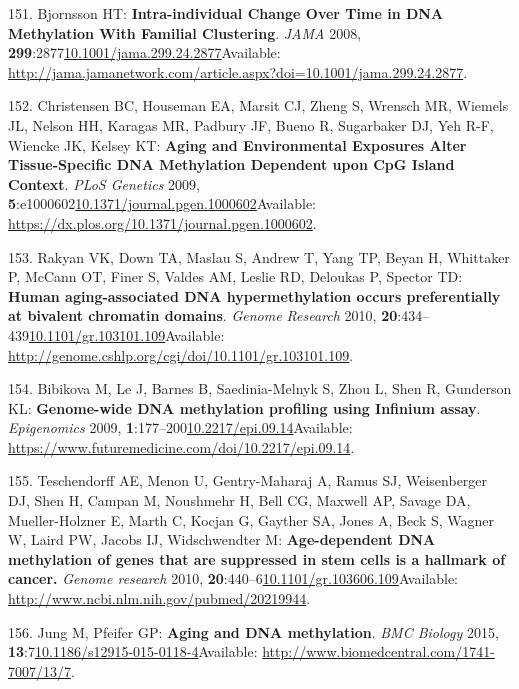 \documentclass[
]{book}
\begin{document}
\leavevmode\hypertarget{ref-Bjornsson2008}{}%
151. Bjornsson HT: \textbf{Intra-individual Change Over Time in DNA Methylation With Familial Clustering}. \emph{JAMA} 2008, \textbf{299}:2877\href{https://doi.org/10.1001/jama.299.24.2877}{10.1001/jama.299.24.2877}Available: \url{http://jama.jamanetwork.com/article.aspx?doi=10.1001/jama.299.24.2877}.

\leavevmode\hypertarget{ref-Christensen2009}{}%
152. Christensen BC, Houseman EA, Marsit CJ, Zheng S, Wrensch MR, Wiemels JL, Nelson HH, Karagas MR, Padbury JF, Bueno R, Sugarbaker DJ, Yeh R-F, Wiencke JK, Kelsey KT: \textbf{Aging and Environmental Exposures Alter Tissue-Specific DNA Methylation Dependent upon CpG Island Context}. \emph{PLoS Genetics} 2009, \textbf{5}:e1000602\href{https://doi.org/10.1371/journal.pgen.1000602}{10.1371/journal.pgen.1000602}Available: \url{https://dx.plos.org/10.1371/journal.pgen.1000602}.

\leavevmode\hypertarget{ref-Rakyan2010}{}%
153. Rakyan VK, Down TA, Maslau S, Andrew T, Yang TP, Beyan H, Whittaker P, McCann OT, Finer S, Valdes AM, Leslie RD, Deloukas P, Spector TD: \textbf{Human aging-associated DNA hypermethylation occurs preferentially at bivalent chromatin domains}. \emph{Genome Research} 2010, \textbf{20}:434--439\href{https://doi.org/10.1101/gr.103101.109}{10.1101/gr.103101.109}Available: \url{http://genome.cshlp.org/cgi/doi/10.1101/gr.103101.109}.

\leavevmode\hypertarget{ref-Bibikova2009}{}%
154. Bibikova M, Le J, Barnes B, Saedinia-Melnyk S, Zhou L, Shen R, Gunderson KL: \textbf{Genome-wide DNA methylation profiling using Infinium assay}. \emph{Epigenomics} 2009, \textbf{1}:177--200\href{https://doi.org/10.2217/epi.09.14}{10.2217/epi.09.14}Available: \url{https://www.futuremedicine.com/doi/10.2217/epi.09.14}.

\leavevmode\hypertarget{ref-Teschendorff2010}{}%
155. Teschendorff AE, Menon U, Gentry-Maharaj A, Ramus SJ, Weisenberger DJ, Shen H, Campan M, Noushmehr H, Bell CG, Maxwell AP, Savage DA, Mueller-Holzner E, Marth C, Kocjan G, Gayther SA, Jones A, Beck S, Wagner W, Laird PW, Jacobs IJ, Widschwendter M: \textbf{Age-dependent DNA methylation of genes that are suppressed in stem cells is a hallmark of cancer.} \emph{Genome research} 2010, \textbf{20}:440--6\href{https://doi.org/10.1101/gr.103606.109}{10.1101/gr.103606.109}Available: \url{http://www.ncbi.nlm.nih.gov/pubmed/20219944}.

\leavevmode\hypertarget{ref-Jung2015}{}%
156. Jung M, Pfeifer GP: \textbf{Aging and DNA methylation}. \emph{BMC Biology} 2015, \textbf{13}:7\href{https://doi.org/10.1186/s12915-015-0118-4}{10.1186/s12915-015-0118-4}Available: \url{http://www.biomedcentral.com/1741-7007/13/7}.
\end{document}
